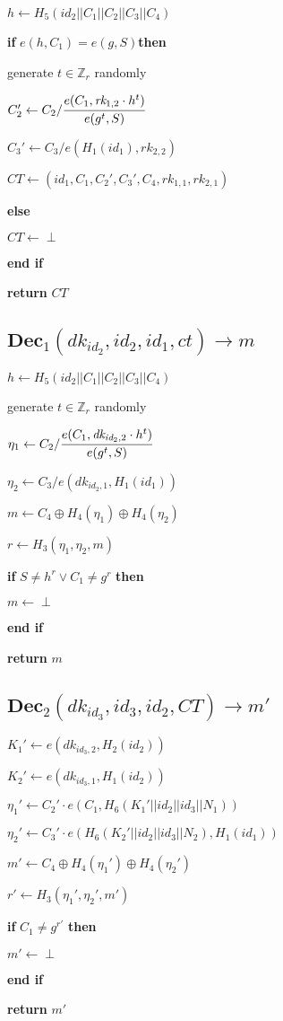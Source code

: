 \documentclass[a4paper]{article}
\begin{document}
$h \gets H_5(\textit{id}_2 || C_1 || C_2 || C_3 || C_4)$

\textbf{if} $e(h, C_1) = e(g, S) $\textbf{then}

generate $t \in \mathbb{Z}_r$ randomly

$C_2' \gets C_2 / \cfrac{e(C_1, \textit{rk}_{1, 2} \cdot h^t)}{e(g^t, S)}$

$C_3' \gets C_3 / e(H_1(\textit{id}_1), \textit{rk}_{2, 2})$

$\textit{CT} \gets (\textit{id}_1, C_1, C_2', C_3', C_4, \textit{rk}_{1, 1}, \textit{rk}_{2, 1})$

\textbf{else}

	\quad$\textit{CT} \gets \perp$

\textbf{end if}

\textbf{return} $\textit{CT}$

\subsection{$\textbf{Dec}_1(\textit{dk}_{\textit{id}_2}, \textit{id}_2, \textit{id}_1, \textit{ct}) \rightarrow m$}

$h \gets H_5(\textit{id}_2 || C_1 || C_2 || C_3 || C_4)$

generate $t \in \mathbb{Z}_r$ randomly

$\eta_1 \gets C_2 / \cfrac{e(C_1, \textit{dk}_{\textit{id}_2, 2} \cdot h^t)}{e(g^t, S)}$

$\eta_2 \gets C_3 / e(\textit{dk}_{\textit{id}_2, 1}, H_1(\textit{id}_1))$

$m \gets C_4 \oplus H_4(\eta_1) \oplus H_4(\eta_2)$

$r \gets H_3(\eta_1, \eta_2, m)$

\textbf{if} $S \neq h^r \lor C_1 \neq g^r$ \textbf{then}

	\quad$m \gets \perp$

\textbf{end if}

\textbf{return} $m$

\subsection{$\textbf{Dec}_2(\textit{dk}_{\textit{id}_3}, \textit{id}_3, \textit{id}_2, \textit{CT}) \rightarrow m'$}

$K_1' \gets e(\textit{dk}_{\textit{id}_3, 2}, H_2(\textit{id}_2))$

$K_2' \gets e(\textit{dk}_{\textit{id}_3, 1}, H_1(\textit{id}_2))$

$\eta_1' \gets C_2' \cdot e(C_1, H_6(K_1' || \textit{id}_2 || \textit{id}_3 || N_1))$

$\eta_2' \gets C_3' \cdot e(H_6(K_2' || \textit{id}_2 || \textit{id}_3 || N_2), H_1(\textit{id}_1))$

$m' \gets C_4 \oplus H_4(\eta_1') \oplus H_4(\eta_2')$

$r' \gets H_3(\eta_1', \eta_2', m')$

\textbf{if} $C_1 \neq g^{r'}$ \textbf{then}

	\quad$m' \gets \perp$

\textbf{end if}

\textbf{return} $m'$
\end{document}
